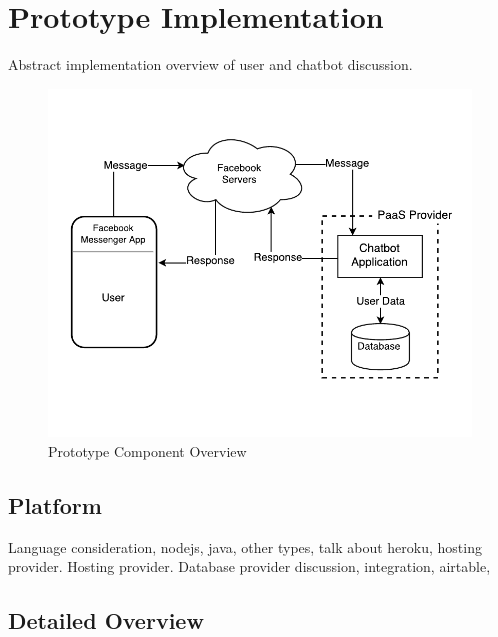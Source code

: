 
\section{Prototype Implementation}

Abstract implementation overview of user and chatbot discussion.

\begin{figure}[H]
    \centering
    \includegraphics[width=5.1in]{../resources/diagrams/chatbot-component-overview.pdf}
    \caption{Prototype Component Overview}
    \label{fig:prototype_component_overview}
\end{figure}

\subsection{Platform}

Language consideration, nodejs, java, other types, talk about heroku, hosting provider. Hosting provider.
Database provider discussion, integration, airtable,

\subsection{Detailed Overview}

